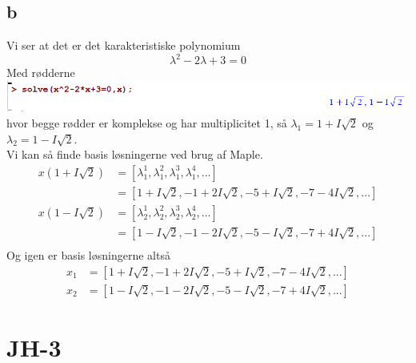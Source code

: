 \documentclass[12pt]{article}
\begin{document}
\subsection{b}
Vi ser at det er det karakteristiske polynomium
$$\lambda^2-2\lambda+3=0$$
Med rødderne\\
\includegraphics[width=\textwidth]{2}\\
hvor begge rødder er komplekse og har multiplicitet 1, så $\lambda_1=1+I\sqrt{2}$ og $\lambda_2=1-I\sqrt{2}$.\\
Vi kan så finde basis løsningerne ved brug af Maple.
\begin{align*}
x(1+I\sqrt{2})&=[\lambda_1^1,\lambda_1^2,\lambda_1^3,\lambda_1^4,...] \\
&=[1+I\sqrt{2},-1+2I\sqrt{2},-5+I\sqrt{2},-7-4I\sqrt{2},...] \\
x(1-I\sqrt{2})&=[\lambda_2^1,\lambda_2^2,\lambda_2^3,\lambda_2^4,...] \\
&=[1-I\sqrt{2},-1-2I\sqrt{2},-5-I\sqrt{2},-7+4I\sqrt{2},...] \\
\end{align*}
Og igen er basis løsningerne altså
\begin{align*}
x_1&=[1+I\sqrt{2},-1+2I\sqrt{2},-5+I\sqrt{2},-7-4I\sqrt{2},...] \\
x_2&=[1-I\sqrt{2},-1-2I\sqrt{2},-5-I\sqrt{2},-7+4I\sqrt{2},...] 
\end{align*}

\section{JH-3}
\end{document}
